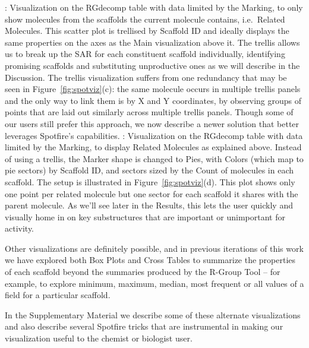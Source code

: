 \documentclass[journal=jacsat,manuscript=article]{achemso}
\newcommand*\fref[1]{Figure~\ref{fig:#1}}
\newcommand*\ie{i.e.~}
\begin{document}
\begin{itemize}
: Visualization on the {RG}decomp table with data limited by the Marking, to only show molecules from the scaffolds the current molecule contains, \ie Related Molecules.  This scatter plot is trellised by Scaffold ID and ideally displays the same properties on the axes as the Main visualization above it.  The trellis allows us to break up the SAR for each constituent scaffold individually, identifying promising scaffolds and substituting unproductive ones as we will describe in the Discussion. The trellis visualization suffers from one redundancy that may be seen in \fref{spotviz}(c): the same molecule occurs in multiple trellis panels and the only way to link them is by X and Y coordinates, by observing groups of points that are laid out similarly across multiple trellis panels.  Though some of our users still prefer this approach, we now describe a newer solution that better leverages Spotfire's capabilities. 
: Visualization on the {RG}decomp table with data limited by the Marking, to display Related Molecules as explained above. Instead of using a trellis, the Marker shape is changed to Pies, with Colors (which map to pie sectors) by Scaffold ID, and sectors sized by the Count of molecules in each scaffold.  The setup is illustrated in \fref{spotviz}(d). This plot shows only one point per related molecule but one sector for each scaffold it shares with the parent molecule.  As we'll see later in the Results, this lets the user quickly and visually home in on key substructures that are important or unimportant for activity. 
\end{itemize}

Other visualizations are definitely possible, and in previous iterations of this work we have explored both Box Plots and Cross Tables to summarize the properties of each scaffold beyond the summaries produced by the R-Group Tool -- for example, to explore minimum, maximum, median, most frequent or all values of a field for a particular scaffold.  

In the Supplementary Material we describe some of these alternate visualizations and also describe several Spotfire tricks that are instrumental in making our visualization useful to the chemist or biologist user. 
\end{document}
